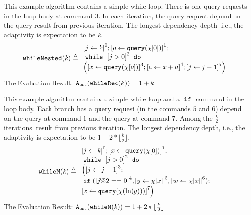     
\begin{example}
\label{ex:whileNested}
This example algorithm contains a simple while loop.
There is one query requests in the loop body at command $3$.
In each iteration, the query request depend on the query result from previous iteration.
The longest dependency depth, i.e., the adaptivity is expectation to be $k$.
%
\[
%
\kw{whileNested}(k) \triangleq
\begin{array}{l}
    \clabel{ \assign{j}{k} }^{0} ; 
    \clabel{ \assign{a}{\query(\chi[0])} }^{1} ; \\
        \ewhile ~ \clabel{j > 0}^{2} ~ \edo ~ \\
        \Big(
         \clabel{\assign{x}{\query(\chi[a]) }}^{3}  ; 
         \clabel{\assign{a}{x + a}}^{4} ;
        \clabel{\assign{j}{j-1}}^{5}       \Big)
    \end{array}
\]
The Evaluation Result: $ {\mathtt{A_{est}}}(\mathtt{whileRec}(k)) = 1 + k$
   \end{example}
            \begin{example}
   \label{ex:whileM}
   This example algorithm contains a simple while loop and a $\;\mathtt{if}\;$ command in the loop body.
Each branch  has a query request (in the commands $5$ and $6$)
depend on the query at command $1$ and the query at command $7$.
Among the $\frac{k}{2}$ iterations,
 result from previous iteration.
The longest dependency depth, i.e., the adaptivity is expectation to be $1 +2 * \lfloor \frac{k}{2} \rfloor$.
            \[
            \kw{whileM}(k) \triangleq 
            \begin{array}{l}
   \clabel{ \assign{j}{k}}^{0} ; 
   \clabel{ \assign{x}{\query(\chi[0])} }^{1} ; \\
\ewhile ~ \clabel{j > 0}^{2} ~ \edo ~ \\
\Big(
 \clabel{\assign{j}{j-1}}^{3} ;\\
 \eif(\clabel{j \% 2 == 0}^{4}, 
 \clabel{\assign{y}{\chi[x]}}^{5}, 
 \clabel{\assign{w}{\chi[x]}}^{6});\\        
 \clabel{\assign{x}{\query(\chi(\ln(y)))} }^{7} \Big)
   \end{array}
            \]
            The Evaluation Result: $ {\mathtt{A_{est}}}(\mathtt{whileM}(k)) = 1 +2 * \lfloor \frac{k}{2} \rfloor $
        \end{example}
